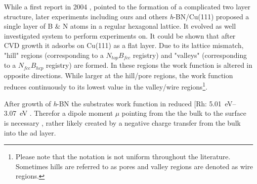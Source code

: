 While a first report in 2004 \cite{corso_boron_2004}, pointed to the formation of a complicated two layer structure, later experiments \cite{roth_chemical_2013, li_grain_2015} including ours \cite{joshi_boron_2012, schwarz_corrugation_2017} and others \textit{h}-BN/Cu(111) proposed a single layer of B \& N atoms in a regular hexagonal lattice. It evolved as well investigated system to perform experiments on. It could be shown that after CVD growth it adsorbs on Cu(111) as a flat layer. Due to its  lattice mismatch, "hill" regions  (corresponding to a $N_{top}B_{fcc}$ registry) and "valleys" (corresponding to a $N_{fcc}B_{hcp}$ registry) are formed. In these regions the work function is altered in opposite directions. While larger at the hill/pore regions, the work function reduces continuously to its lowest value in the valley/wire regions\footnote{Please note that the notation is not uniform throughout the literature. Sometimes hills are referred to as pores and valley regions are denoted as wire regions.}. 

After growth of \textit{h}-BN the substrates work function in reduced [Rh: \SIrange{5.01}{3.07}{\eV} \cite{gomez_diaz_hexagonal_2013}. Therefor a dipole moment $\mu$ pointing from the the bulk to the surface is necessary \cite{roman_periodic_2013}, rather likely created by a negative charge transfer from the bulk into the ad layer.


